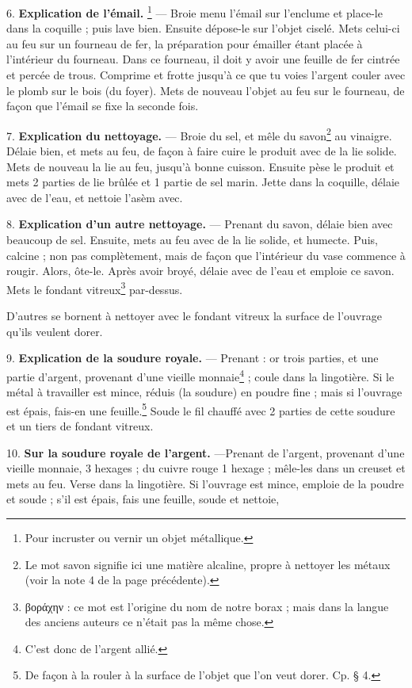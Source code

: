\documentclass[a4paper, 11pt, oneside, polutonikogreek, french]{article}
\begin{document}
6. \textbf{Explication de l'émail.} \footnote{Pour incruster ou vernir un objet métallique.} --- Broie menu l'émail sur l'enclume et place-le dans la coquille ; puis lave bien. Ensuite dépose-le sur l'objet ciselé. Mets celui-ci au feu sur un fourneau de fer, la préparation pour émailler étant placée à l'intérieur du fourneau. Dans ce fourneau, il doit y avoir une feuille de fer cintrée et percée de trous. Comprime et frotte jusqu'à ce que tu voies l'argent couler avec le plomb sur le bois (du foyer). Mets de nouveau l'objet au feu sur le fourneau, de façon que l'émail se fixe la seconde fois.

7. \textbf{Explication du nettoyage.} --- Broie du sel, et mêle du savon\footnote{Le mot savon signifie ici une matière alcaline, propre à nettoyer les métaux (voir la note 4 de la page précédente).} au vinaigre. Délaie bien, et mets au feu, de façon à faire cuire le produit avec de la lie solide. Mets de nouveau la lie au feu, jusqu'à bonne cuisson. Ensuite pèse le produit et mets 2 parties de lie brûlée et 1 partie de sel marin. Jette dans la coquille, délaie avec de l'eau, et nettoie l'asèm avec.

8. \textbf{Explication d'un autre nettoyage.} --- Prenant du savon, délaie bien avec beaucoup de sel. Ensuite, mets au feu avec de la lie solide, et humecte. Puis, calcine ; non pas complètement, mais de façon que l'intérieur du vase commence à rougir. Alors, ôte-le. Après avoir broyé, délaie avec de l'eau et emploie ce savon. Mets le fondant vitreux\footnote{βοράχην : ce mot est l'origine du nom de notre borax ; mais dans la langue des anciens auteurs ce n'était pas la même chose.} par-dessus.

D'autres se bornent à nettoyer avec le fondant vitreux la surface de l'ouvrage qu'ils veulent dorer.

9. \textbf{Explication de la soudure royale.} --- Prenant : or trois parties, et une partie d'argent, provenant d'une vieille monnaie\footnote{C'est donc de l'argent allié.} ; coule dans la lingotière. Si le métal à travailler est mince, réduis (la soudure) en poudre fine ; mais si l'ouvrage est épais, fais-en une feuille.\footnote{De façon à la rouler à la surface de l'objet que l'on veut dorer. Cp. § 4.} Soude le fil chauffé avec 2 parties de cette soudure et un tiers de fondant vitreux.

10. \textbf{Sur la soudure royale de l'argent.} ---Prenant de l'argent, provenant d'une vieille monnaie, 3 hexages ; du cuivre rouge 1 hexage ; mêle-les dans un creuset et mets au feu. Verse dans la lingotière. Si l'ouvrage est mince, emploie de la poudre et soude ; s'il est épais, fais une feuille, soude et nettoie,
\end{document}
